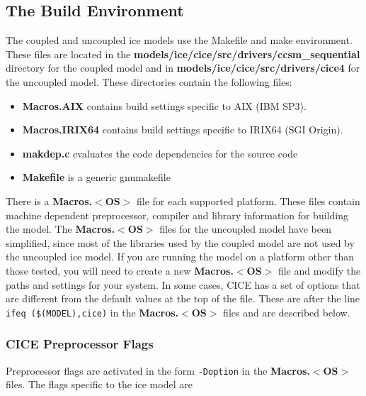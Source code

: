 
\subsection{The Build Environment}

The coupled and uncoupled ice models use the Makefile and make environment.
These files are located in the {\bf models/ice/cice/src/drivers/ccsm_sequential}
directory for the coupled model and in {\bf models/ice/cice/src/drivers/cice4}
for the uncoupled model. These directories contain the following files:

\begin{itemize}
\item  {\bf Macros.AIX} contains build settings specific to AIX (IBM SP3).
\item  {\bf Macros.IRIX64} contains build settings specific to IRIX64 (SGI Origin).
\item  {\bf makdep.c} evaluates the code dependencies for the source code
\item  {\bf Makefile} is a generic gnumakefile
\end{itemize}

There is a {\bf Macros.$<$OS$>$} file for each supported platform. These files contain
machine dependent preprocessor, compiler and library information for building the model.
The {\bf Macros.$<$OS$>$} files for the uncoupled model have been simplified, since most of
the libraries used by the coupled model are not used by the uncoupled ice model. 
If you are running the model on a platform other than those tested, you
will need to create a new {\bf Macros.$<$OS$>$} file and modify the paths and settings
for your system.  In some cases, CICE has a set of options that are different from
the default values at the top of the file.  These are after the line
{\tt ifeq (\$(MODEL),cice)} in the {\bf Macros.$<$OS$>$} files and are described below.

\subsubsection{CICE Preprocessor Flags}

Preprocessor flags are activated in the form {\tt -Doption} in the {\bf Macros.$<$OS$>$}
files.  The flags specific to the ice model are

